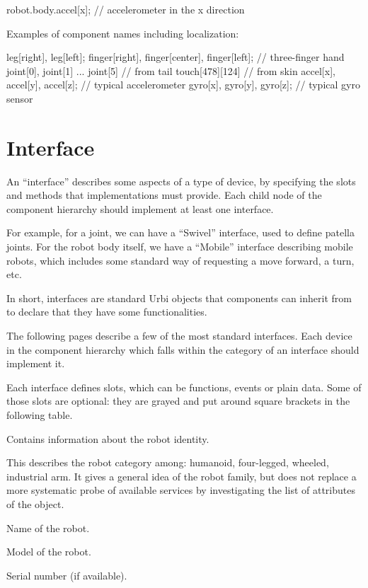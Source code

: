 \begin{urbiunchecked}
robot.body.accel[x]; // accelerometer in the x direction
\end{urbiunchecked}


Examples of component names including localization:

\begin{urbiunchecked}
leg[right], leg[left];
finger[right], finger[center], finger[left];      // three-finger hand
joint[0], joint[1] ... joint[5] // from tail
touch[478][124]                 // from skin
accel[x], accel[y], accel[z];         // typical accelerometer
gyro[x], gyro[y], gyro[z];            // typical gyro sensor
\end{urbiunchecked}

\section{Interface}
\label{sec:interface}

An ``interface'' describes some aspects of a type of device, by specifying the
slots and methods that implementations must provide. Each child node of
the component hierarchy should implement at least one interface.

For example, for a joint, we can have a ``Swivel'' interface, used to define
patella joints. For the robot body itself, we have a ``Mobile'' interface
describing mobile robots, which includes some standard way of
requesting a move forward, a turn, etc.

In short, interfaces are standard Urbi objects that components can inherit
from to declare that they have some functionalities.

The following pages describe a few of the most standard interfaces. Each
device in the component hierarchy which falls within the category of an
interface should implement it.

Each interface defines slots, which can be functions, events or plain data.
Some of those slots are optional: they are grayed and put around square
brackets in the following table.


Contains information about the robot identity.

\begin{slots}
  {
    This describes the robot category among: humanoid, four-legged,
    wheeled, industrial arm. It gives a general idea of the robot
    family, but does not replace a more systematic probe of available
    services by investigating the list of attributes of the object.
  }

  {%
    Name of the robot.%
  }

  {%
    Model of the robot.%
  }

  {%
    Serial number (if available).%
  }

\end{slots}



